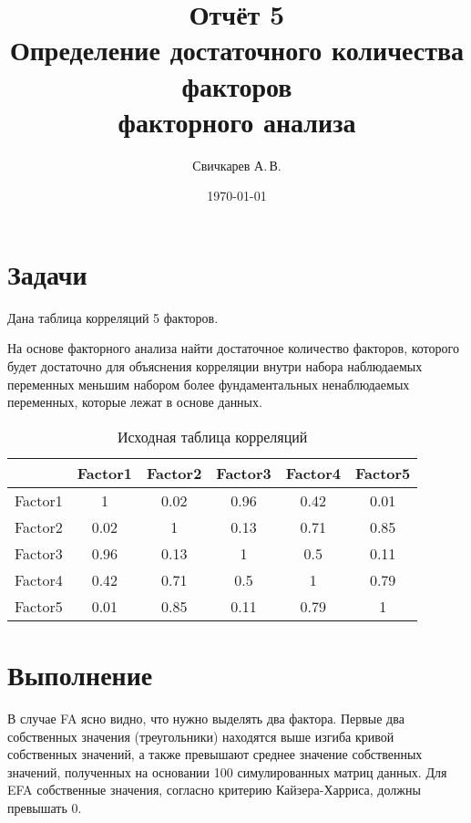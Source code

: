 \documentclass{article} %
\title{Отчёт 5\\
Определение достаточного количества факторов\\
факторного анализа} %
\author{Свичкарев А.\,В.} %
\date{\today} %
\begin{document}

\maketitle %

\section*{Задачи}
Дана таблица корреляций 5 факторов.

На основе факторного анализа найти
достаточное количество факторов,
которого будет достаточно для
объяснения корреляции внутри набора наблюдаемых переменных
меньшим набором более фундаментальных ненаблюдаемых
переменных, которые лежат в основе данных.
\begin{table}[H]
\centering
\begin{tabular}{|c|c|c|c|c|c|}
\hline
        & Factor1 & Factor2 & Factor3 & Factor4 & Factor5\\ \hline
Factor1 & 1       & 0.02    & 0.96    & 0.42    & 0.01 \\ \hline
Factor2 & 0.02    & 1       & 0.13    & 0.71    & 0.85 \\ \hline
Factor3 & 0.96    & 0.13    & 1       & 0.5     & 0.11 \\ \hline
Factor4 & 0.42    & 0.71    & 0.5     & 1       & 0.79 \\ \hline
Factor5 & 0.01    & 0.85    & 0.11    & 0.79    & 1    \\ \hline
\end{tabular}
\caption{Исходная таблица корреляций}
\end{table}

\clearpage
\section*{Выполнение}

В случае FA ясно видно, что нужно выделять два фактора.
Первые два собственных значения (треугольники) находятся выше изгиба
кривой собственных значений, а также превышают среднее значение
собственных значений, полученных на основании 100 симулированных матриц данных.
Для EFA собственные значения, согласно критерию Кайзера-Харриса, должны превышать 0.
\end{document}
